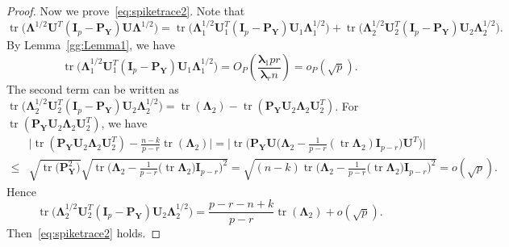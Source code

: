 \documentclass[12pt]{article} %
\DeclareMathOperator{\mytr}{tr}
\newcommand{\bP}{\mathbf{P}}
\newcommand{\bY}{\mathbf{Y}}
\newcommand{\bI}{\mathbf{I}}
\newcommand{\bU}{\mathbf{U}}
\newcommand{\bfsym}[1]{\ensuremath{\boldsymbol{#1}}}
\def\blambda {\bfsym {\lambda}}
\def\bLambda {\bfsym {\Lambda}}
\theoremstyle{definition}
\begin{document}
\begin{appendices}
\begin{proof}
    Now we prove~\eqref{eq:spiketrace2}. Note that
    $$
\mytr\big(\bLambda^{1/2} \bU^T (\bI_p-\bP_{\bY})\bU \bLambda^{1/2}\big)
=
\mytr\big(\bLambda_1^{1/2} \bU_1^T (\bI_p-\bP_{\bY})\bU_1 \bLambda_1^{1/2}\big)
+
\mytr\big(\bLambda_2^{1/2} \bU_2^T (\bI_p-\bP_{\bY})\bU_2 \bLambda_2^{1/2}\big).
    $$
    By Lemma~\ref{gg:Lemma1}, we have 
    $$\mytr\big(\bLambda_1^{1/2} \bU_1^T (\bI_p-\bP_{\bY})\bU_1 \bLambda_1^{1/2}\big)=O_P(\frac{\blambda_1 p r}{\blambda_r n})=o_P(\sqrt{p}).$$
    The second term can be written as
    $
    \mytr\big(\bLambda_2^{1/2} \bU_2^T (\bI_p-\bP_{\bY})\bU_2 \bLambda_2^{1/2}\big)
    =
    \mytr(\bLambda_2)-\mytr(\bP_{\bY}\bU_2\bLambda_2 \bU_2^T)
    $.
    For $\mytr(\bP_{\bY}\bU_2\bLambda_2 \bU_2^T)$, we have
    $$
    \begin{aligned}
        &
        \big|
    \mytr(\bP_{\bY}\bU_2\bLambda_2 \bU_2^T)
    -\frac{n-k}{p-r}\mytr(\bLambda_2)
    \big|
    =
    \Big|
        \mytr\Big(\bP_{\bY} \bU \big(\bLambda_2-\frac{1}{p-r} (\mytr \bLambda_2) \bI_{p-r} \big) \bU^T\Big)
    \Big|
        \\
        \leq &
        \sqrt{\mytr \big(\bP_{\bY}^2\big)}
        \sqrt{\mytr \Big(\bLambda_2-\frac{1}{p-r}\big(\mytr \bLambda_2\big) \bI_{p-r}\Big)^2}
        =\sqrt{(n-k)\mytr \Big(\bLambda_2-\frac{1}{p-r}\big(\mytr \bLambda_2\big) \bI_{p-r}\Big)^2}
        =o(\sqrt{p}).
    \end{aligned}
    $$
    Hence 
    $$
    \mytr\big(\bLambda_2^{1/2} \bU_2^T (\bI_p-\bP_{\bY})\bU_2 \bLambda_2^{1/2}\big)
    =
    \frac{p-r-n+k}{p-r}\mytr(\bLambda_2)+o(\sqrt{p}).
    $$
    Then~\eqref{eq:spiketrace2} holds.
\end{proof}


\end{appendices}
\end{document}
